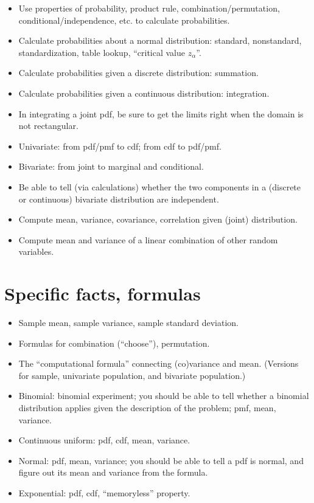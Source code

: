 \documentclass[12pt]{article}
\begin{document}
\begin{itemize}
\item Use properties of probability, product rule,
    combination/permutation, conditional/independence, etc.
    to calculate probabilities.
\item Calculate probabilities about a normal distribution:
    standard, nonstandard, standardization, table lookup,
    ``critical value $z_{\alpha}$''.
\item Calculate probabilities given a discrete distribution:
    summation.
\item Calculate probabilities given a continuous distribution:
    integration.
\item In integrating a joint pdf, be sure to get the limits right when
    the domain is not rectangular.
\item Univariate: from pdf/pmf to cdf; from cdf to pdf/pmf.
\item Bivariate: from joint to marginal and conditional.
\item Be able to tell (via calculations) whether the two components in a
    (discrete or continuous) bivariate distribution are independent.
\item Compute mean, variance, covariance, correlation given (joint) distribution.
\item Compute mean and variance of a linear combination of other random
variables.
\end{itemize}

\section{Specific facts, formulas}
\begin{itemize}
\item Sample mean, sample variance, sample standard deviation.
\item Formulas for combination (``choose''), permutation.
\item The ``computational formula'' connecting (co)variance and mean.
    (Versions for sample, univariate population, and bivariate
    population.)
\item Binomial: binomial experiment; you should be able to tell whether
    a binomial distribution applies given the description of the problem;
    pmf, mean, variance.
\item Continuous uniform: pdf, cdf, mean, variance.
\item Normal: pdf, mean, variance; you should be able to tell a pdf is
    normal, and figure out its mean and variance from the formula.
\item Exponential: pdf, cdf, ``memoryless'' property.
\end{itemize}
\end{document}
